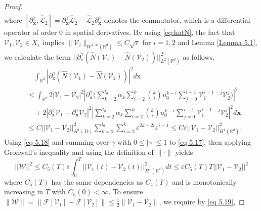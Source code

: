 \documentclass[11pt,reqno,oneside]{amsart}
\numberwithin{equation}{section}
\theoremstyle{definition}
\theoremstyle{remark}
\numberwithin{equation}{section}
\begin{document}
\begin{proof}
\begin{equation}
\begin{aligned}
			\end{aligned}
		\end{equation}
			where $[\partial_\mathbf{x}^\gamma,\hat{\mathcal{L}}_2] =\partial_\mathbf{x}^\gamma \hat{\mathcal{L}}_2- \hat{\mathcal{L}}_2\partial_\mathbf{x}^\gamma $ denotes the commutator, 
		which is a differential operator of order 0 in spatial derivatives. By using \eqref{eq:hatN}, the fact that $\mathscr{V}_1,\mathscr{V}_2 \in X_{\varepsilon}$ implies $\|\mathscr{V}_i\|_{W^{1,\infty}(\mathbb{R}^d)} \leqslant C\sqrt{\varepsilon}$ for $i=1,2$ and Lemma \ref{Lemma 5.1}, we calculate the term $||\partial^{\gamma}_{\mathrm{x}}(\hat{N}(\mathscr{V}_1)-\hat{N}(\mathscr{V}_2))||^{2}_{L^{2}(\mathbb{R}^d)}$ as follows, 
		\begin{equation}\label{eq 5.18}
			\begin{aligned}
			&\quad\int_{\mathbb{R}^d}|\partial^{\gamma}_{\mathrm{x}}(\hat{N}(\mathscr{V}_1)-\hat{N}(\mathscr{V}_2))|^2d\mathrm{x}\\
			&\leqslant\int_{\mathbb{R}^d}2|\mathscr{V}_1-\mathscr{V}_2|^2|\partial^{\gamma}_{\mathbf{x}}\big(\sum_{k=2}^{l_0}\alpha_k\sum_{i=2}^{k}\binom{k}{i}u_0^{k-i}\sum_{j=0}^{i-1}\mathscr{V}^{i-1-j}_1\mathscr{V}^j_2\big)|^2\\
			& \quad +2|\partial^{\gamma}_{\mathbf{x}}\mathscr{V}_1-\partial^{\gamma}_{\mathbf{x}}\mathscr{V}_2|^2|\sum_{k=2}^{l_0}\alpha_k\sum_{i=2}^{k}\binom{k}{i}u_0^{k-i}\sum_{j=0}^{i-1}\mathscr{V}^{i-1-j}_1\mathscr{V}^j_2|^2d\mathbf{x}\\
			&\leqslant C ||\mathscr{V}_1-\mathscr{V}_2||^2_{H^{1}(D)}\sum_{k=2}^{l_0}\sum_{i=2}^{k}\varepsilon^{2k-2i}\varepsilon^{i-1}\leqslant C \varepsilon ||\mathscr{V}_1-\mathscr{V}_2||^2_{H^{1}(\mathbb{R}^d)}.
			\end{aligned}
		\end{equation}
		Using \eqref{eq 5.18} and summing over $\gamma$ with $0\leqslant|\gamma|\leqslant 1$ to \eqref{eq 5.17}, then applying Gronwall's inequality and using the definition of \(\|\cdot\|\) yields
		\begin{equation}\label{eq 5.19}
			||\mathscr{W}||^{2}\leqslant C_{5}(T)\varepsilon \int_{0}^{T}||\mathscr{V}_1(t)-\mathscr{V}_2(t)||^2_{H^{1}(\mathbb{R}^d)}dt \leqslant \varepsilon C_{5}(T)T ||\mathscr{V}_1-\mathscr{V}_2||^2
		\end{equation}
		where \(C_5(T)\) has the same dependencies as \(C_4(T)\) and is monotonically increasing in \(T\) with \(C_5(0) < \infty\). 	To ensure \(\|\mathscr{W}\|=\| \mathscr{F}[\mathscr{V}_1]-\mathscr{F}[\mathscr{V}_2]\| \leqslant \frac{1}{2} \|\mathscr{V}_1 - \mathscr{V}_2\|\), we require by \eqref{eq 5.19}, 

\end{proof}
\end{document}
